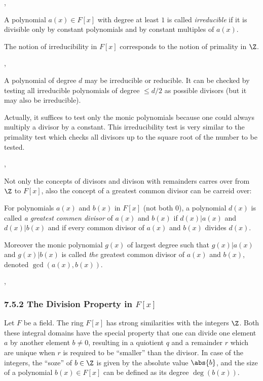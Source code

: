 \sep

 A polynomial $a(x)\in F[x]$ with degree at least
$1$ is called \emph{irreducible} if it is divisible only by constant polynomials
and by constant multiples of $a(x)$.

\Com The notion of irreducibility in $F[x]$	corresponds to the notion of
primality in $\Z$.

\sep

\Lem A polynomial of degree $d$ may be irreducible or reducible. It can be
checked by testing all irreducible polynomials of degree $\leq d/2$ as possible
divisors (but it may also be irreducible).

Actually, it suffices to test only the monic polynomials because one could
always multiply a divisor by a constant. This irreducibility test is very
similar to the primality test which checks all divisors up to the square root of
the number to be tested.

\sep

Not only the concepts of divisors and divison with remainders carres over from
$\Z$ to $F[x]$, also the concept of a greatest common divisor can be carreid
over:

 For polynomials $a(x)$ and $b(x)$ in $F[x]$ (not both $0$), a
polynomial $d(x)$ is called \emph{a greatest commen divisor} of $a(x)$ and
$b(x)$ if $d(x)|a(x)$ and $d(x)|b(x)$ and if every common divisor of $a(x)$ and
$b(x)$ divides $d(x)$.

Moreover the monic polynomial $g(x)$ of largest degree such that $g(x)|a(x)$ and
$g(x)|b(x)$ is called \emph{the} greatest common divisor of $a(x)$ and $b(x)$,
denoted $\gcd(a(x),b(x))$.


\sep

\subsubsection*{7.5.2 The Division Property in $F[x]$}

Let $F$ be a field. The ring $F[x]$ has strong similarities with the integers
$\Z$. Both these integral domains have the special property that one can divide
one element $a$ by another element $b\neq 0$, resulting in a quiotient $q$ and a
remainder $r$ which are unique when $r$ is required to be ``smaller'' than the
divisor. In case of the integers, the ``soze'' of $b\in \Z$ is given by the
absolute value $\abs{b}$, and the size of a polynomial $b(x)\in F[x]$ can be
defined as its degree $\deg(b(x))$.

